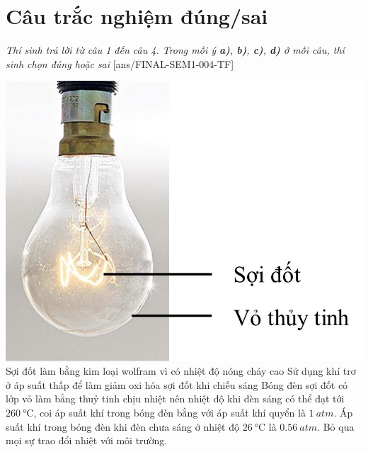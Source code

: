 \section{Câu trắc nghiệm đúng/sai} 
\textit{Thí sinh trả lời từ câu 1 đến câu 4. Trong mỗi ý \textbf{a)}, \textbf{b)}, \textbf{c)}, \textbf{d)} ở mỗi câu, thí sinh chọn đúng hoặc sai}
\setcounter{ex}{0}
[ans/FINAL-SEM1-004-TF]
\begin{ex}
	{\includegraphics[scale=0.3]{../figs/FINAL-SEM1-004-6}}
	{Sợi đốt làm bằng kim loại wolfram vì có nhiệt độ nóng chảy cao}
	{Sử dụng khí trơ ở áp suất thấp để làm giảm oxi hóa sợi đốt khi chiếu sáng}
	{Bóng đèn sợi đốt có lớp vỏ làm bằng thuỷ tinh chịu nhiệt nên nhiệt độ khi đèn sáng có thể đạt tới $\SI{260}{\celsius}$, coi áp suất khí trong bóng đèn bằng với áp suất khí quyển là $\SI{1}{atm}$. Áp suất khí trong bóng đèn khi đèn chưa sáng ở nhiệt độ $\SI{26}{\celsius}$ là $\SI{0.56}{atm}$. Bỏ qua mọi sự trao đổi nhiệt với môi trường.}
	\loigiai{}
\end{ex}
